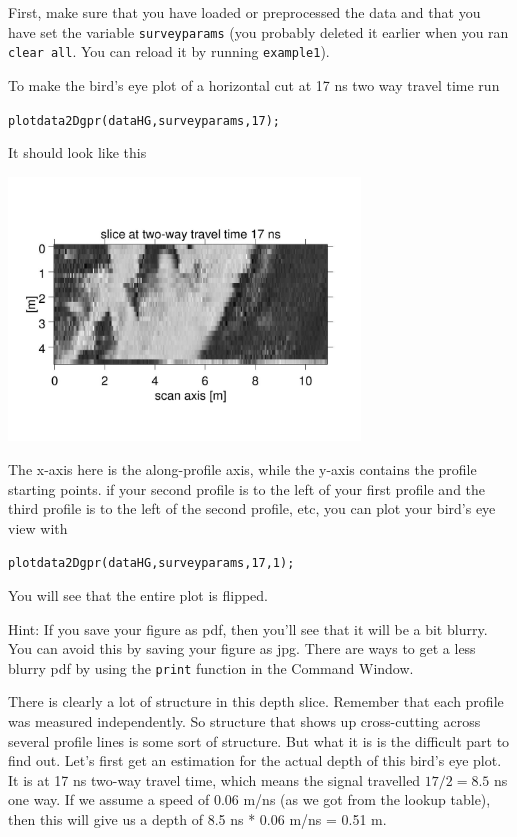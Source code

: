 \documentclass[11pt]{article}
\begin{document}
First, make sure that you have loaded or preprocessed the data and
that you have set the variable \verb#surveyparams# (you probably
deleted it earlier when you ran \verb#clear all#. You can reload it by
running \verb#example1#).

To make the bird's eye plot of a horizontal cut at 17 ns two way
travel time run

\qquad \verb#plotdata2Dgpr(dataHG,surveyparams,17);#

It should look like this
\begin{center}
\includegraphics[width=0.7\textwidth, trim = 1cm 3cm 1cm
  3cm,clip]{figures/Area17ns.jpg}
\end{center}

The x-axis here is the along-profile axis, while the y-axis contains
the profile starting points. if your second profile is to the left of
your first profile and the third profile is to the left of the second
profile, etc, you can plot your bird's eye view with

\qquad \verb#plotdata2Dgpr(dataHG,surveyparams,17,1);#

You will see that the entire plot is flipped.

Hint: If you save your figure as pdf, then you'll see that it will be
a bit blurry. You can avoid this by saving your figure as jpg. There
are ways to get a less blurry pdf by using the \verb#print# function
in the Command Window.

There is clearly a lot of structure in this depth slice. Remember that
each profile was measured independently. So structure that shows up
cross-cutting across several profile lines is some sort of
structure. But what it is is the difficult part to find out. Let's
first get an estimation for the actual depth of this bird's eye
plot. It is at 17 ns two-way travel time, which means the signal
travelled $17/2=8.5$ ns one way. If we assume a speed of 0.06 m/ns (as
we got from the lookup table), then this will give us a depth of 8.5
ns * 0.06 m/ns = 0.51 m.
\end{document}
